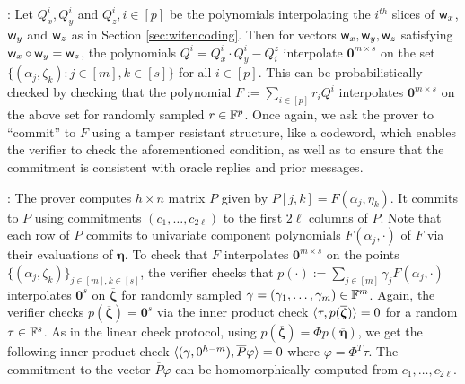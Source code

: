 : Let $Q^i_x,Q^i_y$ and $Q^i_z, i\in [p]$ be the
polynomials interpolating the $i^{th}$ slices of $\mathsf{w}_x$, $\mathsf{w}_y$ and $\mathsf{w}_z$
 as in Section \ref{sec:witencoding}. Then for vectors $\mathsf{w}_x,\mathsf{w}_y,\mathsf{w}_z$ satisfying
$\mathsf{w}_x\circ \mathsf{w}_y=\mathsf{w}_z$, the polynomials $Q^i=Q^i_x\cdot Q^i_y - Q^z_i$ interpolate
$\bm{0}^{m\times s}$ on the set $\{(\alpha_j,\zeta_k):j\in [m],k\in [s]\}$ for all $i\in [p]$. This can be probabilistically
checked by checking that the polynomial $F := \sum_{i\in [p]}r_iQ^i$ interpolates
$\bm{0}^{m\times s}$ on the above set for randomly sampled $r\in \mathbb{F}^p$. Once again, we
ask the prover to ``commit'' to $F$ using a tamper resistant structure, like a codeword,
which enables the verifier to check the aforementioned condition, as well as to
ensure that the commitment is consistent with oracle replies and prior
messages.

: The prover computes 
$h\times n$ matrix $P$ given by $P[j,k]=F(\alpha_j,\eta_k)$. It commits to $P$
using commitments $(c_1,\ldots,c_{2\ell})$ to the first $2\ell$ columns of $P$.
Note that each row of $P$ commits to univariate component polynomials
$F(\alpha_j,\cdot)$ of $F$ via their evaluations of $\bm{\eta}$. To check that
$F$ interpolates $\bm{0}^{m\times s}$ on the points
$\{(\alpha_j,\zeta_k)\}_{j\in [m],k\in [s]}$, the verifier checks that
$p(\cdot) := \sum_{j\in [m]}\gamma_jF(\alpha_j,\cdot)$ interpolates $\bm{0}^s$ on
$\overline{\bm{\zeta}}$ for randomly sampled $\gamma=(\gamma_1,\ldots,\gamma_m)\in \mathbb{F}^m$.
Again, the verifier checks $p(\overline{\bm{\zeta}})=\bm{0}^s$ via the inner product
check $\langle \tau,p(\overline{\bm{\zeta}})\rangle=0$ for a random $\tau\in \mathbb{F}^s$. As in the
linear check protocol, using $p(\overline{\bm{\zeta}})=\Phi p(\overline{\bm{\eta}})$, we
get the following inner product check
$\langle (\gamma,0^{h-m}),\overline{P}\varphi\rangle=0$ where $\varphi=\Phi^T\tau$. 
The commitment to the vector $\overline{P}\varphi$ can be homomorphically computed
from $c_1,\ldots,c_{2\ell}$.

